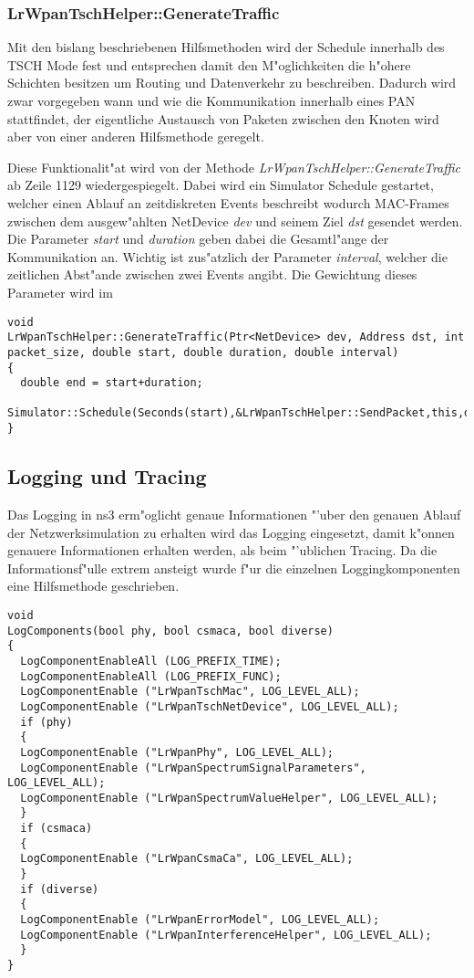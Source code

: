 \subsubsection{LrWpanTschHelper::GenerateTraffic}

Mit den bislang beschriebenen Hilfsmethoden wird der Schedule innerhalb des TSCH
Mode fest und entsprechen damit den M"oglichkeiten die h"ohere Schichten besitzen
um Routing und Datenverkehr zu beschreiben. Dadurch wird zwar vorgegeben wann und
wie die Kommunikation innerhalb eines PAN stattfindet, der eigentliche Austausch von
Paketen zwischen den Knoten wird aber von einer anderen Hilfsmethode geregelt.

Diese Funktionalit"at wird von der Methode \textit{LrWpanTschHelper::GenerateTraffic}
ab Zeile 1129 wiedergespiegelt. Dabei wird ein Simulator Schedule gestartet, welcher
einen Ablauf an zeitdiskreten Events beschreibt wodurch MAC-Frames zwischen dem
ausgew"ahlten NetDevice \textit{dev} und seinem Ziel \textit{dst} gesendet werden.
Die Parameter \textit{start} und \textit{duration} geben dabei die Gesamtl"ange
der Kommunikation an. Wichtig ist zus"atzlich der Parameter \textit{interval}, welcher
die zeitlichen Abst"ande zwischen zwei Events angibt. Die Gewichtung dieses Parameter
wird im

\begin{lstlisting}[frame=single]
void
LrWpanTschHelper::GenerateTraffic(Ptr<NetDevice> dev, Address dst, int packet_size, double start, double duration, double interval)
{
  double end = start+duration;
  Simulator::Schedule(Seconds(start),&LrWpanTschHelper::SendPacket,this,dev,dst,packet_size,interval,end);
}
\end{lstlisting}


\subsection{Logging und Tracing}

Das Logging in ns3 erm"oglicht genaue Informationen "'uber den genauen Ablauf
der Netzwerksimulation zu erhalten wird das Logging eingesetzt, damit k"onnen
genauere Informationen erhalten werden, als beim "'ublichen Tracing. Da die
Informationsf"ulle extrem ansteigt wurde f"ur die einzelnen Loggingkomponenten
eine Hilfsmethode geschrieben.

\begin{lstlisting}[frame=single]
void
LogComponents(bool phy, bool csmaca, bool diverse)
{
  LogComponentEnableAll (LOG_PREFIX_TIME);
  LogComponentEnableAll (LOG_PREFIX_FUNC);
  LogComponentEnable ("LrWpanTschMac", LOG_LEVEL_ALL);
  LogComponentEnable ("LrWpanTschNetDevice", LOG_LEVEL_ALL);
  if (phy)
  {
  LogComponentEnable ("LrWpanPhy", LOG_LEVEL_ALL);
  LogComponentEnable ("LrWpanSpectrumSignalParameters", LOG_LEVEL_ALL);
  LogComponentEnable ("LrWpanSpectrumValueHelper", LOG_LEVEL_ALL);
  }
  if (csmaca)
  {
  LogComponentEnable ("LrWpanCsmaCa", LOG_LEVEL_ALL);
  }
  if (diverse)
  {
  LogComponentEnable ("LrWpanErrorModel", LOG_LEVEL_ALL);
  LogComponentEnable ("LrWpanInterferenceHelper", LOG_LEVEL_ALL);
  }
}
\end{lstlisting}

